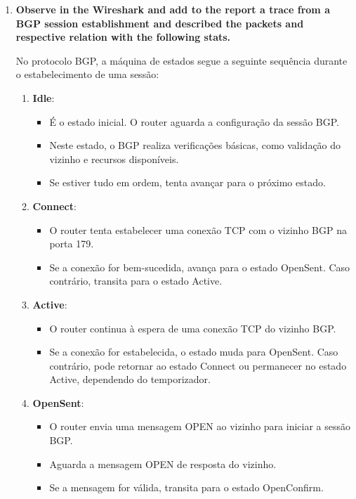 \documentclass[11pt,english, openright, oneside]{book}
\begin{document}
\begin{enumerate}
  \item \textbf{Observe in the Wireshark and add to the report a trace from a BGP session establishment and described 
  the packets and respective relation with the following stats.} 
  \vspace{0.2cm}

  No protocolo BGP, a máquina de estados segue a seguinte sequência durante o estabelecimento de uma sessão:

  \begin{enumerate}
    \item \textbf{Idle}: 
    \begin{itemize}
      \item É o estado inicial. O router aguarda a configuração da sessão BGP.
      \item Neste estado, o BGP realiza verificações básicas, como validação do vizinho e recursos disponíveis.
      \item Se estiver tudo em ordem, tenta avançar para o próximo estado.
    \end{itemize}
    \item \textbf{Connect}: 
    \begin{itemize}
      \item O router tenta estabelecer uma conexão TCP com o vizinho BGP na porta 179.
      \item Se a conexão for bem-sucedida, avança para o estado OpenSent. Caso contrário, transita para o estado Active.
    \end{itemize}
    \item \textbf{Active}: 
    \begin{itemize}
      \item O router continua à espera de uma conexão TCP do vizinho BGP.
      \item Se a conexão for estabelecida, o estado muda para OpenSent. Caso contrário, pode retornar ao estado Connect ou permanecer no estado Active, dependendo do temporizador.
    \end{itemize}
    \item \textbf{OpenSent}:
    \begin{itemize}
      \item O router envia uma mensagem OPEN ao vizinho para iniciar a sessão BGP.
      \item Aguarda a mensagem OPEN de resposta do vizinho.
      \item Se a mensagem for válida, transita para o estado OpenConfirm.
    \end{itemize}

\end{enumerate}
\end{enumerate}
\end{document}
